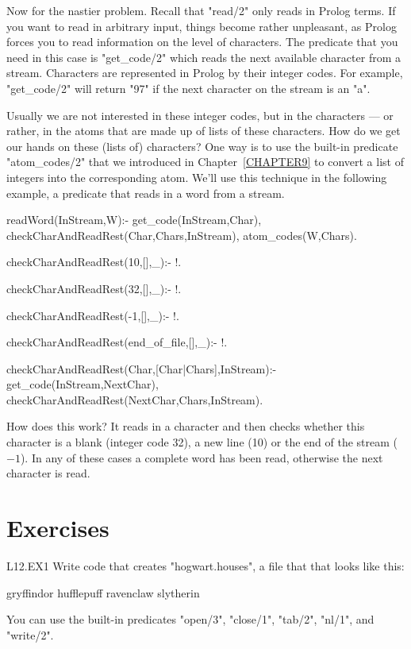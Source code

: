 Now for the nastier problem.  Recall that "read/2" only reads in
Prolog terms. If you want to read in arbitrary input, things become
rather unpleasant, as Prolog forces you to read information on the
level of characters.  The predicate that you need in this case is
"get_code/2" which reads the next
available character from a stream.  Characters are represented in
Prolog by their integer codes. For example, "get_code/2" will return "97"
if the next character on the stream is an "a".

Usually we are not interested in these integer codes, but in the
characters --- or rather, in the atoms that are made up of lists of
these characters. How do we get our hands on these (lists of)
characters? One way is to use the built-in predicate "atom_codes/2"
that we introduced in
Chapter~\ref{CHAPTER9} to convert a list of integers into the
corresponding atom. We'll use this technique in the following example,
a predicate that reads in a word from a
stream.

\begin{LPNcodedisplay}
readWord(InStream,W):-
   get_code(InStream,Char),
   checkCharAndReadRest(Char,Chars,InStream),
   atom_codes(W,Chars).


checkCharAndReadRest(10,[],_):- !.

checkCharAndReadRest(32,[],_):- !.

checkCharAndReadRest(-1,[],_):- !.

checkCharAndReadRest(end_of_file,[],_):- !.

checkCharAndReadRest(Char,[Char|Chars],InStream):-
   get_code(InStream,NextChar),
   checkCharAndReadRest(NextChar,Chars,InStream).
\end{LPNcodedisplay}

How does this work?  It reads in a character and then checks whether
this character is a blank (integer code 32), a new line (10) or the
end of the stream ($-1$). In any of these cases a complete word has been
read, otherwise the next character is read.


\section{Exercises}\label{SEC.L12.EXERCISES}

\begin{LPNexercise}{L12.EX1}
Write code that creates  "hogwart.houses", a file that  that looks
like this:
\begin{LPNcodedisplay}
       gryffindor
hufflepuff     ravenclaw
       slytherin
\end{LPNcodedisplay}
You can use the built-in predicates "open/3", "close/1", "tab/2",
"nl/1", and "write/2".
\end{LPNexercise}



